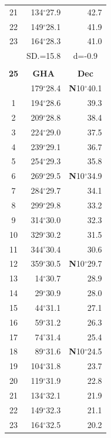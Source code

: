 \documentclass[10pt, a4paper]{report}
\begin{document}
\begin{scriptsize}
\begin{tabular*}{0.2\textwidth}[t]{@{\extracolsep{\fill}}|c|rr|}
21 & 134$^\circ$27.9 & \raisebox{0.24ex}{\boldmath$\cdot$~\boldmath$\cdot$~~}42.7\\
22 & 149$^\circ$28.1 & 41.9\\
23 & 164$^\circ$28.3 & 41.0\\
\hline
\rule{0pt}{2.4ex} & \multicolumn{1}{c}{SD.=15.8} & \multicolumn{1}{c|}{d=-0.9}\\
\hline
\multicolumn{1}{c}{}\\[-0.5ex]\hline
\multicolumn{1}{|c|}{\rule{0pt}{2.6ex}\textbf{25}} & \multicolumn{1}{c}{\textbf{GHA}} & \multicolumn{1}{c|}{\textbf{Dec}}\\
\hline\rule{0pt}{2.6ex}\noindent
0 & 179$^\circ$28.4 & \textbf{N}10$^\circ$40.1\\
1 & 194$^\circ$28.6 & 39.3\\
2 & 209$^\circ$28.8 & 38.4\\
3 & 224$^\circ$29.0 & \raisebox{0.24ex}{\boldmath$\cdot$~\boldmath$\cdot$~~}37.5\\
4 & 239$^\circ$29.1 & 36.7\\
5 & 254$^\circ$29.3 & 35.8\\[2Pt]
6 & 269$^\circ$29.5 & \textbf{N}10$^\circ$34.9\\
7 & 284$^\circ$29.7 & 34.1\\
8 & 299$^\circ$29.8 & 33.2\\
9 & 314$^\circ$30.0 & \raisebox{0.24ex}{\boldmath$\cdot$~\boldmath$\cdot$~~}32.3\\
10 & 329$^\circ$30.2 & 31.5\\
11 & 344$^\circ$30.4 & 30.6\\[2Pt]
12 & 359$^\circ$30.5 & \textbf{N}10$^\circ$29.7\\
13 & 14$^\circ$30.7 & 28.9\\
14 & 29$^\circ$30.9 & 28.0\\
15 & 44$^\circ$31.1 & \raisebox{0.24ex}{\boldmath$\cdot$~\boldmath$\cdot$~~}27.1\\
16 & 59$^\circ$31.2 & 26.3\\
17 & 74$^\circ$31.4 & 25.4\\[2Pt]
18 & 89$^\circ$31.6 & \textbf{N}10$^\circ$24.5\\
19 & 104$^\circ$31.8 & 23.7\\
20 & 119$^\circ$31.9 & 22.8\\
21 & 134$^\circ$32.1 & \raisebox{0.24ex}{\boldmath$\cdot$~\boldmath$\cdot$~~}21.9\\
22 & 149$^\circ$32.3 & 21.1\\
23 & 164$^\circ$32.5 & 20.2\\

\end{tabular*}
\end{scriptsize}
\end{document}
